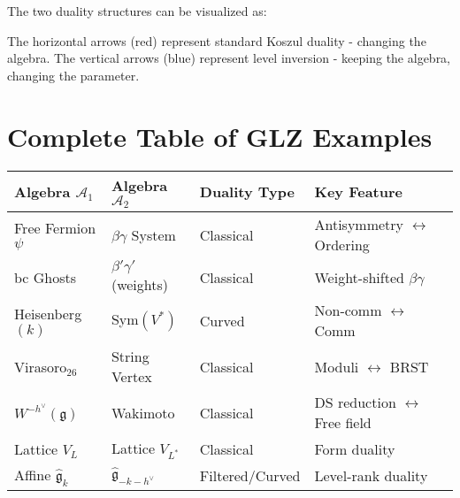 \begin{remark}
The two duality structures can be visualized as:

\begin{center}
\end{center}

The horizontal arrows (red) represent standard Koszul duality - changing the algebra.
The vertical arrows (blue) represent level inversion - keeping the algebra, changing the parameter.
\end{remark}
 
\section{Complete Table of GLZ Examples}
 
\begin{center}
\begin{tabular}{|l|l|l|l|}
\hline
Algebra $\mathcal{A}_1$ & Algebra $\mathcal{A}_2$ & Duality Type & Key Feature \\
\hline
Free Fermion $\psi$ & $\beta\gamma$ System & Classical & Antisymmetry $\leftrightarrow$ Ordering \\
bc Ghosts & $\beta'\gamma'$ (weights) & Classical & Weight-shifted $\beta\gamma$ \\
Heisenberg$(k)$ & Sym$(V^*)$ & Curved & Non-comm $\leftrightarrow$ Comm \\
Virasoro$_{26}$ & String Vertex & Classical & Moduli $\leftrightarrow$ BRST \\
$W^{-h^\vee}(\mathfrak{g})$ & Wakimoto & Classical & DS reduction $\leftrightarrow$ Free field \\
Lattice $V_L$ & Lattice $V_{L^*}$ & Classical & Form duality \\
Affine $\hat{\mathfrak{g}}_k$ & $\hat{\mathfrak{g}}_{-k-h^\vee}$ & Filtered/Curved & Level-rank duality \\
\hline
\end{tabular}
\end{center}
 
